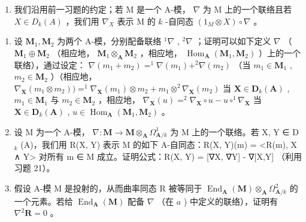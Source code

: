\begin{enumerate}
\def\labelenumi{\arabic{enumi})}
\setcounter{enumi}{21}
\tightlist
\item
  我们沿用前一习题的约定；若 M 是一个 A-模， \(\nabla\) 为 M 上的一个联络且若 \(X \in D_k(A)\) ，我们用 \(\nabla_X\) 表示 M 的 \(k\) -自同态 \((1_M \otimes X) \circ \nabla\) 。
\end{enumerate}

\begin{enumerate}
\def\labelenumi{\alph{enumi})}
\item
  设 \(\mathbf{M}_1, \mathbf{M}_2\) 为两个 A-模，分别配备联络 \(^1\nabla\) , \(^2\nabla\) ；证明可以如下定义 \(\nabla\) （ \(\mathbf{M}_1 \oplus \mathbf{M}_2\) （相应地， \(\mathbf{M}_1 \otimes_{\mathbf{A}} \mathbf{M}_2\) ，相应地， \(\operatorname{Hom}_{\mathbf{A}}(\mathbf{M}_1, \mathbf{M}_2)\) ）上的一个联络），通过设定： \(\nabla(m_1 + m_2) = ^1\nabla(m_1) + ^2\nabla(m_2)\) （当 \(m_1 \in \mathbf{M}_1\) , \(m_2 \in \mathbf{M}_2\) ）（相应地， \(\nabla_{\mathbf{X}}(m_1 \otimes m_2)) = ^1\nabla_{\mathbf{X}}(m_1) \otimes m_2 + m_1 \otimes ^2\nabla_{\mathbf{X}}(m_2)\) 当 \(\mathbf{X} \in \mathbf{D}_k(\mathbf{A})\) , \(m_1 \in \mathbf{M}_1\) 与 \(m_2 \in \mathbf{M}_2\) ，相应地， \(\nabla_{\mathbf{X}}(u) = ^2\nabla_{\mathbf{X}} \circ u - u \circ ^1\nabla_{\mathbf{X}}\) 当 \(\mathbf{X} \in \mathbf{D}_k(\mathbf{A})\) , \(u \in \operatorname{Hom}_{\mathbf{A}}(\mathbf{M}_1, \mathbf{M}_2)\) 。
\item
  设 M 为一个 A-模， \(\nabla: \mathbf{M} \to \mathbf{M} \otimes_{\mathbf{A}} \Omega_{\mathbf{A}/k}^{1}\) 为 M 上的一个联络。若 X, Y ∈ D \(_{k}\) (A)，我们用 R(X, Y) 表示 M 的如下 A-自同态：R(X, Y)(m) = \textless R(m), X ∧ Y\textgreater{} 对所有 m ∈ M 成立。证明公式：R(X, Y) = {[}∇X, ∇Y{]} - ∇{[}X,Y{]} （利用习题 21）。
\item
  假设 A-模 M 是投射的，从而曲率同态 R 被等同于 \(\operatorname{End}_{\mathbf{A}}(\mathbf{M}) \otimes_{\mathbf{A}} \Omega_{\mathbf{A}/k}^{2}\) 的一个元素。若给 \(\operatorname{End}_{\mathbf{A}}(\mathbf{M})\) 配备 \(\nabla\) （在 \(a\) ) 中定义的联络），证明有 \(\nabla^{2}\mathbf{R} = 0\) 。
\end{enumerate}

